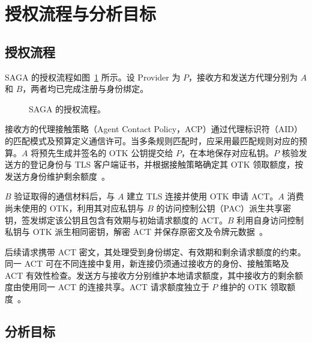 
\section{授权流程与分析目标}
\label{sec:authorization-workflow-objectives}

\subsection{授权流程}
\label{subsec:authorization-workflow}

SAGA 的授权流程如图~\ref{fig:saga-authorization-workflow} 所示。设 Provider 为 $P$，接收方和发送方代理分别为 $A$ 和 $B$，两者均已完成注册与身份绑定。

\begin{figure}[tb]
  \centering
  
  \caption{SAGA 的授权流程。}
  \label{fig:saga-authorization-workflow}
\end{figure}

接收方的代理接触策略（Agent Contact Policy，ACP）通过代理标识符（AID）的匹配模式及预算定义通信许可。当多条规则匹配时，应采用最匹配规则对应的预算。$A$ 将预先生成并签名的 OTK 公钥提交给 $P$，在本地保存对应私钥。$P$ 核验发送方的登记身份与 TLS 客户端证书，并根据接触策略确定其 OTK 领取额度，按发送方身份维护剩余额度~\cite{syros2025sagaV2,sagaReferenceImpl2026}。

$B$ 验证取得的通信材料后，与 $A$ 建立 TLS 连接并使用 OTK 申请 ACT。$A$ 消费尚未使用的 OTK，利用其对应私钥与 $B$ 的访问控制公钥（PAC）派生共享密钥，签发绑定该公钥且包含有效期与初始请求额度的 ACT。$B$ 利用自身访问控制私钥与 OTK 派生相同密钥，解密 ACT 并保存原密文及令牌元数据~\cite{syros2025sagaV2,sagaReferenceImpl2026}。

后续请求携带 ACT 密文，其处理受到身份绑定、有效期和剩余请求额度的约束。同一 ACT 可在不同连接中复用，新连接仍须通过接收方的身份、接触策略及 ACT 有效性检查。发送方与接收方分别维护本地请求额度，其中接收方的剩余额度由使用同一 ACT 的连接共享。ACT 请求额度独立于 $P$ 维护的 OTK 领取额度~\cite{sagaReferenceImpl2026}。

\subsection{分析目标}
\label{subsec:analysis-objectives-assumptions}

